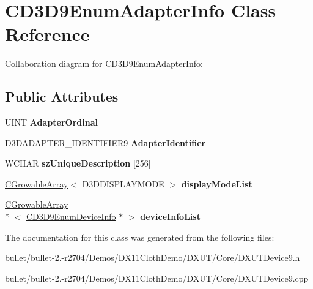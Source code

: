 \hypertarget{class_c_d3_d9_enum_adapter_info}{\section{C\+D3\+D9\+Enum\+Adapter\+Info Class Reference}
\label{class_c_d3_d9_enum_adapter_info}
}


Collaboration diagram for C\+D3\+D9\+Enum\+Adapter\+Info\+:
\subsection*{Public Attributes}
\begin{DoxyCompactItemize}
\item 
\hypertarget{class_c_d3_d9_enum_adapter_info_a18c83cc609097240e466645badc24f3e}{U\+I\+N\+T {\bfseries Adapter\+Ordinal}}\label{class_c_d3_d9_enum_adapter_info_a18c83cc609097240e466645badc24f3e}

\item 
\hypertarget{class_c_d3_d9_enum_adapter_info_a36c8867b3f7ad5c6f959d8f38fd3da46}{D3\+D\+A\+D\+A\+P\+T\+E\+R\+\_\+\+I\+D\+E\+N\+T\+I\+F\+I\+E\+R9 {\bfseries Adapter\+Identifier}}\label{class_c_d3_d9_enum_adapter_info_a36c8867b3f7ad5c6f959d8f38fd3da46}

\item 
\hypertarget{class_c_d3_d9_enum_adapter_info_a11a7d35da4764543b5c86eca65d6de46}{W\+C\+H\+A\+R {\bfseries sz\+Unique\+Description} \mbox{[}256\mbox{]}}\label{class_c_d3_d9_enum_adapter_info_a11a7d35da4764543b5c86eca65d6de46}

\item 
\hypertarget{class_c_d3_d9_enum_adapter_info_ab7c774bdab3aa4cf6d619289523929a5}{\hyperlink{class_c_growable_array}{C\+Growable\+Array}$<$ D3\+D\+D\+I\+S\+P\+L\+A\+Y\+M\+O\+D\+E $>$ {\bfseries display\+Mode\+List}}\label{class_c_d3_d9_enum_adapter_info_ab7c774bdab3aa4cf6d619289523929a5}

\item 
\hypertarget{class_c_d3_d9_enum_adapter_info_abec258deda6db939be6caaa0818454bd}{\hyperlink{class_c_growable_array}{C\+Growable\+Array}\\*
$<$ \hyperlink{class_c_d3_d9_enum_device_info}{C\+D3\+D9\+Enum\+Device\+Info} $\ast$ $>$ {\bfseries device\+Info\+List}}\label{class_c_d3_d9_enum_adapter_info_abec258deda6db939be6caaa0818454bd}

\end{DoxyCompactItemize}


The documentation for this class was generated from the following files\+:\begin{DoxyCompactItemize}
\item 
bullet/bullet-\/2.-\/r2704/\+Demos/\+D\+X11\+Cloth\+Demo/\+D\+X\+U\+T/\+Core/D\+X\+U\+T\+Device9.\+h\item 
bullet/bullet-\/2.-\/r2704/\+Demos/\+D\+X11\+Cloth\+Demo/\+D\+X\+U\+T/\+Core/D\+X\+U\+T\+Device9.\+cpp\end{DoxyCompactItemize}
